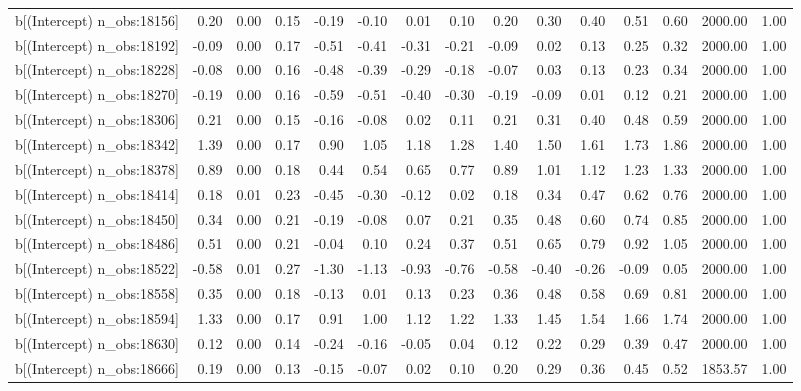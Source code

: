 \begin{table}[ht]
\begin{tabular}{rrrrrrrrrrrrrrr}
  b[(Intercept) n\_obs:18156] & 0.20 & 0.00 & 0.15 & -0.19 & -0.10 & 0.01 & 0.10 & 0.20 & 0.30 & 0.40 & 0.51 & 0.60 & 2000.00 & 1.00 \\ 
  b[(Intercept) n\_obs:18192] & -0.09 & 0.00 & 0.17 & -0.51 & -0.41 & -0.31 & -0.21 & -0.09 & 0.02 & 0.13 & 0.25 & 0.32 & 2000.00 & 1.00 \\ 
  b[(Intercept) n\_obs:18228] & -0.08 & 0.00 & 0.16 & -0.48 & -0.39 & -0.29 & -0.18 & -0.07 & 0.03 & 0.13 & 0.23 & 0.34 & 2000.00 & 1.00 \\ 
  b[(Intercept) n\_obs:18270] & -0.19 & 0.00 & 0.16 & -0.59 & -0.51 & -0.40 & -0.30 & -0.19 & -0.09 & 0.01 & 0.12 & 0.21 & 2000.00 & 1.00 \\ 
  b[(Intercept) n\_obs:18306] & 0.21 & 0.00 & 0.15 & -0.16 & -0.08 & 0.02 & 0.11 & 0.21 & 0.31 & 0.40 & 0.48 & 0.59 & 2000.00 & 1.00 \\ 
  b[(Intercept) n\_obs:18342] & 1.39 & 0.00 & 0.17 & 0.90 & 1.05 & 1.18 & 1.28 & 1.40 & 1.50 & 1.61 & 1.73 & 1.86 & 2000.00 & 1.00 \\ 
  b[(Intercept) n\_obs:18378] & 0.89 & 0.00 & 0.18 & 0.44 & 0.54 & 0.65 & 0.77 & 0.89 & 1.01 & 1.12 & 1.23 & 1.33 & 2000.00 & 1.00 \\ 
  b[(Intercept) n\_obs:18414] & 0.18 & 0.01 & 0.23 & -0.45 & -0.30 & -0.12 & 0.02 & 0.18 & 0.34 & 0.47 & 0.62 & 0.76 & 2000.00 & 1.00 \\ 
  b[(Intercept) n\_obs:18450] & 0.34 & 0.00 & 0.21 & -0.19 & -0.08 & 0.07 & 0.21 & 0.35 & 0.48 & 0.60 & 0.74 & 0.85 & 2000.00 & 1.00 \\ 
  b[(Intercept) n\_obs:18486] & 0.51 & 0.00 & 0.21 & -0.04 & 0.10 & 0.24 & 0.37 & 0.51 & 0.65 & 0.79 & 0.92 & 1.05 & 2000.00 & 1.00 \\ 
  b[(Intercept) n\_obs:18522] & -0.58 & 0.01 & 0.27 & -1.30 & -1.13 & -0.93 & -0.76 & -0.58 & -0.40 & -0.26 & -0.09 & 0.05 & 2000.00 & 1.00 \\ 
  b[(Intercept) n\_obs:18558] & 0.35 & 0.00 & 0.18 & -0.13 & 0.01 & 0.13 & 0.23 & 0.36 & 0.48 & 0.58 & 0.69 & 0.81 & 2000.00 & 1.00 \\ 
  b[(Intercept) n\_obs:18594] & 1.33 & 0.00 & 0.17 & 0.91 & 1.00 & 1.12 & 1.22 & 1.33 & 1.45 & 1.54 & 1.66 & 1.74 & 2000.00 & 1.00 \\ 
  b[(Intercept) n\_obs:18630] & 0.12 & 0.00 & 0.14 & -0.24 & -0.16 & -0.05 & 0.04 & 0.12 & 0.22 & 0.29 & 0.39 & 0.47 & 2000.00 & 1.00 \\ 
  b[(Intercept) n\_obs:18666] & 0.19 & 0.00 & 0.13 & -0.15 & -0.07 & 0.02 & 0.10 & 0.20 & 0.29 & 0.36 & 0.45 & 0.52 & 1853.57 & 1.00 \\ 

\end{tabular}
\end{table}
